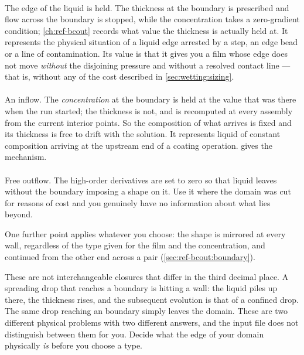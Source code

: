 \paragraph{} The edge of the liquid is held. The thickness at
the boundary is prescribed and flow across the boundary is stopped, while the
concentration takes a zero-gradient condition; \cref{ch:ref-bcout} records what
value the thickness is actually held at. It represents the physical
situation of a liquid edge arrested by a step, an edge bead or a line of
contamination. Its value is that it gives you a film whose edge does not move
\emph{without} the disjoining pressure and without a resolved contact line ---
that is, without any of the cost described in \cref{sec:wetting:sizing}.

\paragraph{} An inflow. The \emph{concentration} at the
boundary is held at the value that was there when the run started; the
thickness is not, and is recomputed at every assembly from the current interior
points. So the composition of what arrives is fixed and its thickness is free
to drift with the solution. It represents liquid of constant composition
arriving at the upstream end of a coating operation.
 gives the mechanism.

\paragraph{} Free outflow. The high-order derivatives are set to
zero so that liquid leaves without the boundary imposing a shape on it. Use it
where the domain was cut for reasons of cost and you genuinely have no
information about what lies beyond.

One further point applies whatever you choose: the  shape is
mirrored at every wall, regardless of the type given for the film and the
concentration, and continued from the other end across a  pair
(\cref{sec:ref-bcout:boundary}).

\begin{warn}
  These are not interchangeable closures that differ in the third decimal
  place. A spreading drop that reaches a  boundary is hitting a
  wall: the liquid piles up there, the thickness rises, and the subsequent
  evolution is that of a confined drop. The same drop reaching an
   boundary simply leaves the domain. These are two different
  physical problems with two different answers, and the input file does not
  distinguish between them for you. Decide what the edge of your domain
  physically \emph{is} before you choose a type.
\end{warn}
